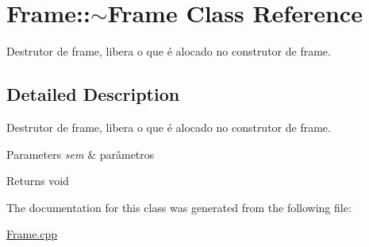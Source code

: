 \hypertarget{class_frame_1_1~_frame}{}\section{Frame\+:\+:$\sim$\+Frame Class Reference}
\label{class_frame_1_1~_frame}


Destrutor de frame, libera o que é alocado no construtor de frame.  




\subsection{Detailed Description}
Destrutor de frame, libera o que é alocado no construtor de frame. 


\begin{DoxyParams}{Parameters}
{\em sem} & parâmetros \\
\hline
\end{DoxyParams}
\begin{DoxyReturn}{Returns}
void 
\end{DoxyReturn}


The documentation for this class was generated from the following file\+:\begin{DoxyCompactItemize}
\item 
\hyperlink{_frame_8cpp}{Frame.\+cpp}\end{DoxyCompactItemize}
